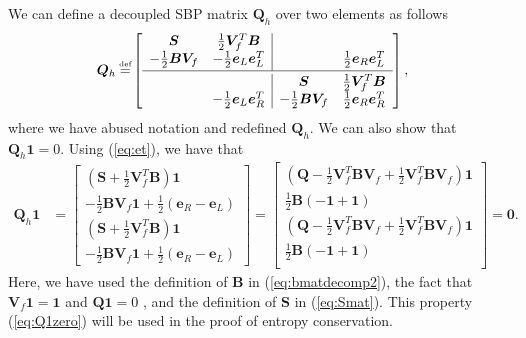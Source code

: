 \documentclass[onefignum,onetabnum,final]{siamart171218}
\newcommand{\LRp}[1]{\left( #1 \right)}
\newcommand{\LRs}[1]{\left[ #1 \right]}
\newcommand\myeq{\mathrel{\stackrel{\makebox[0pt]{\mbox{\normalfont\tiny def}}}{=}}}
\begin{document}
We can define a decoupled SBP matrix $\bm{Q}_h$ over two elements as follows
\begin{align}
\bm{Q}_h \myeq& \LRs{\begin{array}{cc|cc}
\bm{S} &  \frac{1}{2}\bm{V}_f^T\bm{B} & & \\
 -\frac{1}{2}\bm{B}\bm{V}_f & -\frac{1}{2}\bm{e}_L\bm{e}_L^T & & \frac{1}{2}\bm{e}_R\bm{e}_L^T\\ [.2em]
 \hline\\[-1.0em]
&& \bm{S} & \frac{1}{2}\bm{V}_f^T\bm{B} \\
& -\frac{1}{2}\bm{e}_L\bm{e}_R^T & - \frac{1}{2}\bm{B}\bm{V}_f & \frac{1}{2}\bm{e}_R\bm{e}_R^T
\end{array}}, \label{eq:decoupledsbp2elem}
\end{align}
where we have abused notation and redefined $\bm{Q}_h$.  We can also show that $\bm{Q}_h\bm{1} = 0$.  Using (\ref{eq:et}), we have that
\begin{align}
\bm{Q}_h\bm{1} &= \begin{bmatrix}
\LRp{\bm{S} + \frac{1}{2}\bm{V}_f^T\bm{B} }\bm{1}\\
-\frac{1}{2}\bm{B}\bm{V}_f\bm{1} + \frac{1}{2}\LRp{\bm{e}_R-\bm{e}_L}\\
\LRp{\bm{S} + \frac{1}{2}\bm{V}_f^T\bm{B} }\bm{1}\\
-\frac{1}{2}\bm{B}\bm{V}_f\bm{1} + \frac{1}{2}\LRp{\bm{e}_R-\bm{e}_L}
\end{bmatrix} 
= 
\begin{bmatrix}
\LRp{\bm{Q} - \frac{1}{2}\bm{V}_f^T\bm{B}\bm{V}_f + \frac{1}{2}\bm{V}_f^T\bm{B}\bm{V}_f}\bm{1}\\
\frac{1}{2}\bm{B}\LRp{-\bm{1} + \bm{1}}\\
\LRp{\bm{Q} - \frac{1}{2}\bm{V}_f^T\bm{B}\bm{V}_f + \frac{1}{2}\bm{V}_f^T\bm{B}\bm{V}_f}\bm{1}\\
\frac{1}{2}\bm{B}\LRp{-\bm{1} + \bm{1}}\\
\end{bmatrix} = \bm{0}.
\label{eq:Q1zero}
\end{align}
Here, we have used the definition of $\bm{B}$ in (\ref{eq:bmatdecomp2}), the fact that $\bm{V}_f\bm{1} = \bm{1}$ and $\bm{Q}\bm{1} = 0$ \cite{fernandez2014generalized}, and the definition of $\bm{S}$ in (\ref{eq:Smat}).  This property (\ref{eq:Q1zero}) will be used in the proof of entropy conservation.  
\end{document}
